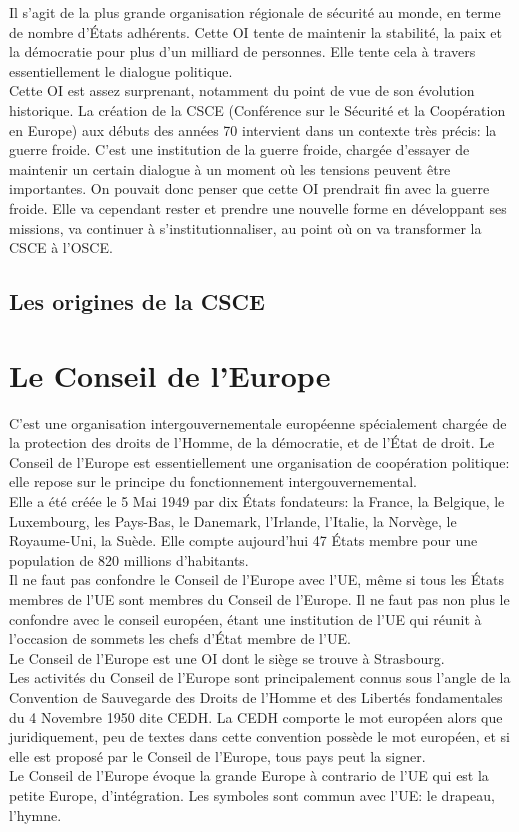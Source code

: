 \documentclass[10pt, a4paper, openany]{book}
\begin{document}
Il s'agit de la plus grande organisation régionale de sécurité au monde, en terme de nombre d'États adhérents. Cette OI tente de maintenir la stabilité, la paix et la démocratie pour plus d'un milliard de personnes. Elle tente cela à travers essentiellement le dialogue politique. \\
Cette OI est assez surprenant, notamment du point de vue de son évolution historique. La création de la CSCE (Conférence sur le Sécurité et la Coopération en Europe) aux débuts des années 70 intervient dans un contexte très précis: la guerre froide. C'est une institution de la guerre froide, chargée d'essayer de maintenir un certain dialogue à un moment où les tensions peuvent être importantes. On pouvait donc penser que cette OI prendrait fin avec la guerre froide. Elle va cependant rester et prendre une nouvelle forme en développant ses missions, va continuer à s'institutionnaliser, au point où on va transformer la CSCE à l'OSCE. \\



\section{Les origines de la CSCE}



\chapter{Le Conseil de l'Europe}

C'est une organisation intergouvernementale européenne spécialement chargée de la protection des droits de l'Homme, de la démocratie, et de l'État de droit. Le Conseil de l'Europe est essentiellement une organisation de coopération politique: elle repose sur le principe du fonctionnement intergouvernemental.  \\
Elle a été créée le 5 Mai 1949 par dix États fondateurs: la France, la Belgique, le Luxembourg, les Pays-Bas, le Danemark, l'Irlande, l'Italie, la Norvège, le Royaume-Uni, la Suède. Elle compte aujourd'hui 47 États membre pour une population de 820 millions d'habitants. \\
Il ne faut pas confondre le Conseil de l'Europe avec l'UE, même si tous les États membres de l'UE sont membres du Conseil de l'Europe. Il ne faut pas non plus le confondre avec le conseil européen, étant une institution de l'UE qui réunit à l'occasion de sommets les chefs d'État membre de l'UE. \\
Le Conseil de l'Europe est une OI dont le siège se trouve à Strasbourg. \\
Les activités du Conseil de l'Europe sont principalement connus sous l'angle de la Convention de Sauvegarde des Droits de l'Homme et des Libertés fondamentales du 4 Novembre 1950 dite CEDH. La CEDH comporte le mot européen alors que juridiquement, peu de textes dans cette convention possède le mot européen, et si elle est proposé par le Conseil de l'Europe, tous pays peut la signer. \\
Le Conseil de l'Europe évoque la grande Europe à contrario de l'UE qui est la petite Europe, d'intégration. Les symboles sont commun avec l'UE: le drapeau, l'hymne. 
\end{document}
